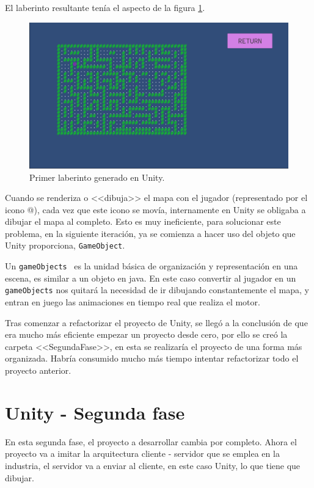 El laberinto resultante tenía el aspecto de la figura \ref{fig:PrimerLaberinto}.
\begin{figure}[hb]  
    \centering  
    \includegraphics[width=\textwidth]{img/PrimerLaberinto.png}  
    \caption{Primer laberinto generado en Unity.}  
    \label{fig:PrimerLaberinto}
\end{figure}

Cuando se renderiza o <<dibuja>> el mapa con el jugador (representado por el icono @), cada vez que este icono se movía, internamente en Unity se obligaba a dibujar el mapa al completo. Esto es muy ineficiente, para solucionar este problema, en la siguiente iteración, ya se comienza a hacer uso del objeto que Unity proporciona, \texttt{GameObject}.

Un \texttt{gameObjects}~\cite{UnityGameObject} es la unidad básica de organización y representación en una escena, es similar a un objeto en java. En este caso convertir al jugador en un \texttt{gameObjects} nos quitará la necesidad de ir dibujando constantemente el mapa, y entran en juego las animaciones en tiempo real que realiza el motor.

Tras comenzar a refactorizar el proyecto de Unity, se llegó a la conclusión de que era mucho más eficiente empezar un proyecto desde cero, por ello se creó la carpeta <<SegundaFase>>, en esta se realizaría el proyecto de una forma más organizada. Habría consumido mucho más tiempo intentar refactorizar todo el proyecto anterior.


\section{Unity - Segunda fase}
En esta segunda fase, el proyecto a desarrollar cambia por completo. Ahora el proyecto va a imitar la arquitectura cliente - servidor que se emplea en la industria, el servidor va a enviar al cliente, en este caso Unity, lo que tiene que dibujar.

